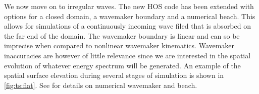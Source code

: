 
%
%
%
%
%
%
%



We now move on to irregular waves.
The new HOS code has been extended with options for a closed domain, a wavemaker boundary and a numerical beach. 
This allows for simulations of a continuously incoming wave filed that is absorbed on the far end of the domain. 
The wavemaker boundary is linear and can so be imprecise when compared to nonlinear wavemaker kinematics. 
Wavemaker inaccuracies are however of little relevance since we are interested in the spatial evolution of whatever energy spectrum will be generated. 
An example of the spatial surface elevation during several stages of simulation is shown in \autoref{fig:ts:flat}.
See \citet{SFo2018_HOS,bonnefoy2010,bonnefoy2006A_BM,ducrozet2006_BM} for details on numerical wavemaker and beach.
\\




